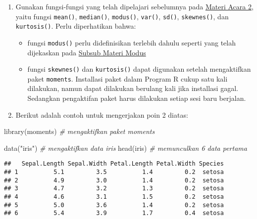 \documentclass[
]{book}
\newenvironment{Shaded}{\begin{snugshade}}{\end{snugshade}}
\newcommand{\CommentTok}[1]{\textcolor[rgb]{0.56,0.35,0.01}{\textit{#1}}}
\newcommand{\FunctionTok}[1]{\textcolor[rgb]{0.00,0.00,0.00}{#1}}
\newcommand{\NormalTok}[1]{#1}
\newcommand{\StringTok}[1]{\textcolor[rgb]{0.31,0.60,0.02}{#1}}
\providecommand{\tightlist}{%
  \setlength{\itemsep}{0pt}\setlength{\parskip}{0pt}}
\begin{document}
\begin{enumerate}
\def\labelenumi{\arabic{enumi}.}
\setcounter{enumi}{1}
\tightlist
\item
  Gunakan fungsi-fungsi yang telah dipelajari sebelumnya pada \protect\hyperlink{a2-materi}{Materi Acara 2}, yaitu fungsi \texttt{mean()}, \texttt{median()}, \texttt{modus()}, \texttt{var()}, \texttt{sd()}, \texttt{skewnes()}, dan \texttt{kurtosis()}. Perlu diperhatikan bahwa:

  \begin{itemize}
  \tightlist
  \item
    fungsi \texttt{modus()} perlu didefinisikan terlebih dahulu seperti yang telah dijekaskan pada \protect\hyperlink{a2-modus}{Subsub Materi Modus}
  \item
    fungsi \texttt{skewnes()} dan \texttt{kurtosis()} dapat digunakan setelah mengaktifkan paket \texttt{moments}. Installasi paket dalam Program R cukup satu kali dilakukan, namun dapat dilakukan berulang kali jika installasi gagal. Sedangkan pengaktifan paket harus dilakukan setiap sesi baru berjalan.
  \end{itemize}
\item
  Berikut adalah contoh untuk mengerjakan poin 2 diatas:
\end{enumerate}

\begin{Shaded}
\begin{Highlighting}[]
\FunctionTok{library}\NormalTok{(moments)  }\CommentTok{\# mengaktifkan paket moments}

\FunctionTok{data}\NormalTok{(}\StringTok{"iris"}\NormalTok{) }\CommentTok{\# mengaktifkan data iris}
\FunctionTok{head}\NormalTok{(iris)   }\CommentTok{\# memunculkan 6 data pertama}
\end{Highlighting}
\end{Shaded}

\begin{verbatim}
##   Sepal.Length Sepal.Width Petal.Length Petal.Width Species
## 1          5.1         3.5          1.4         0.2  setosa
## 2          4.9         3.0          1.4         0.2  setosa
## 3          4.7         3.2          1.3         0.2  setosa
## 4          4.6         3.1          1.5         0.2  setosa
## 5          5.0         3.6          1.4         0.2  setosa
## 6          5.4         3.9          1.7         0.4  setosa
\end{verbatim}
\end{document}

